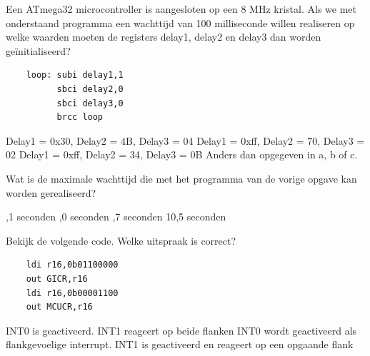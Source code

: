 \documentclass[a4paper,12pt,fleqn,dutch]{tisdexam}
\begin{document}
\begin{questions}
\question
\label{opg:opg10}
Een ATmega32 microcontroller is aangesloten op een 8 MHz kristal.
Als we met onderstaand programma een wachttijd van 100 milliseconde
willen realiseren op welke waarden moeten de registers delay1, delay2 en
delay3 dan worden ge\"{i}nitialiseerd?
\begin{verbatim}
    loop: subi delay1,1
          sbci delay2,0
          sbci delay3,0
          brcc loop
\end{verbatim}
\begin{choices}
	\choice Delay1 = 0x30, Delay2 = 4B, Delay3 = 04
	\CorrectChoice \label{ans:opg10} Delay1 = 0x{f}{f}, Delay2 = 70, Delay3 = 02
	\choice Delay1 = 0x{f}{f}, Delay2 = 34, Delay3 = 0B
	\choice Anders dan opgegeven in a, b of c.
\end{choices}


\question
\label{opg:opg11}
Wat is de maximale wachttijd die met het programma van de vorige opgave kan worden
gerealiseerd?
\begin{choices}
	,1 seconden
	,0 seconden
	,7 seconden
	\CorrectChoice \label{ans:opg11} 10,5 seconden
\end{choices}


\question
\label{opg:opg12}
Bekijk de volgende code. Welke uitspraak is correct?
\begin{verbatim}
    ldi r16,0b01100000
    out GICR,r16
    ldi r16,0b00001100
    out MCUCR,r16
\end{verbatim}
\begin{choices}
	\CorrectChoice \label{ans:opg12} INT0 is geactiveerd.
	\choice INT1 reageert op beide flanken
	\choice INT0 wordt geactiveerd als flankgevoelige interrupt.
	\choice INT1 is geactiveerd en reageert op een opgaande flank
\end{choices}



\end{questions}
\end{document}
